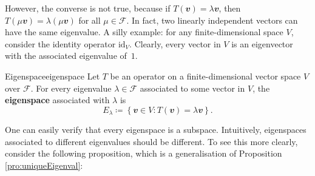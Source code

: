 \documentclass[math, code]{amznotes}
\theoremstyle{remark}
\begin{document}
However, the converse is not true, because if $T(\mathbfit{v}) = \lambda\mathbfit{v}$, then $T(\mu\mathbfit{v}) = \lambda(\mu\mathbfit{v})$ for all $\mu \in \mathcal{F}$. In fact, two linearly independent vectors can have the same eigenvalue. A silly example: for any finite-dimensional space $V$, consider the identity operator $\mathrm{id}_V$. Clearly, every vector in $V$ is an eigenvector with the associated eigenvalue of~$1$.
\begin{dfnbox}{Eigenspace}{eigenspace}
    Let $T$ be an operator on a finite-dimensional vector space $V$ over $\mathcal{F}$. For every eigenvalue $\lambda \in \mathcal{F}$ associated to some vector in $V$, the {\color{red} \textbf{eigenspace}} associated with $\lambda$ is 
    \begin{equation*}
        E_\lambda \coloneqq \left\{\mathbfit{v} \in V \colon T(\mathbfit{v}) = \lambda\mathbfit{v}\right\}.
    \end{equation*}
\end{dfnbox}
One can easily verify that every eigenspace is a subspace. Intuitively, eigenspaces associated to different eigenvalues should be different. To see this more clearly, consider the following proposition, which is a generalisation of Proposition \ref{pro:uniqueEigenval}:
\end{document}

